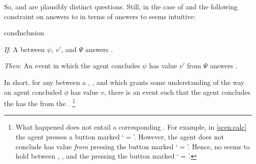 \begin{note}
  So, \qWhy{} and \qHow{} are plausibly distinct questions.
  Still, in the case of \qWhy{} and \qHow{} the following constraint on answers to \qWhy{} in terms of answers to \qHow{} seems intuitive:

  \begin{constraint}{consInclusion}{\issueInclusion{}}
    \mbox{ }
    \vspace{-\baselineskip}
    \begin{itenum}
    \item[\emph{If}:]
      A \ros{} between \(\psi\), \(v'\), and \(\Psi\) answers \qWhy{}.
    \item[\emph{Then}:]
      An event in which the agent concludes \(\psi\) has value \(v'\) from \(\Psi\) answers \qHow{}.
    \end{itenum}
    \vspace{-\baselineskip}
  \end{constraint}

  \noindent%
  In short, for any \ros{} between a , , and \pool{} which grants some understanding of the way an agent concluded \(\phi\) has value \(v\), there is an event such that the agent concludes the \prop{} has the \val{} from the \pool{}.%
  \footnote{
    What happened does not entail a corresponding \ros{}.
    For example, in \autoref{scen:calc} the agent presses a button marked `\(=\)'.
    However, the agent does not conclude \propM{\gistCalcEq{}} has value  \emph{from} pressing the button marked `\(=\)'.
    Hence, no \ros{} seems to hold between \propM{\gistCalcEq{}}, , and the pressing the button marked `\(=\)'.
  }
\end{note}


